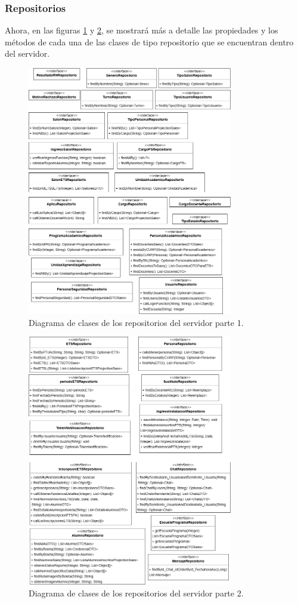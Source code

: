 \subsubsection{Repositorios}
Ahora, en las figuras \ref{fig:DR1} y \ref{fig:DR2}, se mostrará más a detalle las propiedades y los métodos de cada una de las clases de tipo repositorio que se encuentran dentro del servidor.

\begin{figure}[htbp!]
	\begin{center}
		\includegraphics[width=0.8\textwidth]{Clases/Repo1.png}
		\caption{Diagrama de clases de los repositorios del servidor parte 1.}
		\label{fig:DR1}
	\end{center}
\end{figure}

\begin{figure}[htbp!]
	\begin{center}
		\includegraphics[width=0.8\textwidth]{Clases/Repo2.png}
		\caption{Diagrama de clases de los repositorios del servidor parte 2.}
		\label{fig:DR2}
	\end{center}
\end{figure}